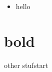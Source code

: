 \documentclass{article}
\begin{document}
\begin{itemize}
\item hello


\end{itemize}
\section{bold}

other stufstart
\end{document}

